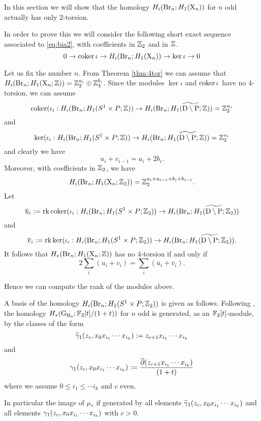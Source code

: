 In this section we will show that the homology $H_{i}(\operatorname{Br}_n; H_1(\mathrm{X}_n))$ for $n$ odd actually has only $2$-torsion.

In order to prove this we will consider the following short exact sequence associated to \eqref{eq:bia2}, with coefficients in $\mathbb{Z}_2$ and in $\mathbb{Z}$.
$$
0 \to \operatorname{\mathrm{coker}} \iota \to H_{i}(\operatorname{Br}_n; H_1(\mathrm{X}_n)) \to \ker \iota \to 0
$$

Let us fix the number $n$. From Theorem \ref{thm:4tor} we can assume that $H_{i}(\operatorname{Br}_n; H_1(\mathrm{X}_n; \mathbb{Z})) = \mathbb{Z}_2^{a_i} \oplus \mathbb{Z}_4^{b_i}$.
Since the modules $\ker \iota$ and $\operatorname{\mathrm{coker}} \iota$ have no $4$-torsion, we can assume $$\operatorname{\mathrm{coker}} (\iota_i :H_{i}(\operatorname{Br}_n; H_1(S^1 \times P;\mathbb{Z})) \to H_{i}(\operatorname{Br}_n; H_1(\widetilde{\mathrm{D} \setminus \mathrm{P}};\mathbb{Z}) ) = \mathbb{Z}_2^{u_i}$$ and $$\ker (\iota_i :H_{i}(\operatorname{Br}_n; H_1(S^1 \times P;\mathbb{Z})) \to H_{i}(\operatorname{Br}_n; H_1(\widetilde{\mathrm{D} \setminus \mathrm{P}};\mathbb{Z}) ) = \mathbb{Z}_2^{v_i}$$
and clearly we have 
$$
u_i + v_{i-1} = a_i + 2 b_i.
$$
Moreover, with coefficients in $\mathbb{Z}_2$, we have
$$
H_{i}(\operatorname{Br}_n; H_1(\mathrm{X}_n; \mathbb{Z}_2)) = \mathbb{Z}_2^{a_i+a_{i-1} + b_i + b_{i-1}}.
$$
Let $$\overline{u}_i := {\operatorname{rk}} \operatorname{\mathrm{coker}} (\iota_i :H_{i}(\operatorname{Br}_n; H_1(S^1 \times P ;\mathbb{Z}_2)) \to H_{i}(\operatorname{Br}_n; H_1(\widetilde{\mathrm{D} \setminus \mathrm{P}} ;\mathbb{Z}_2) ) $$
and 
$$\overline{v}_i := {\operatorname{rk}} \ker (\iota_i :H_{i}(\operatorname{Br}_n; H_1(S^1 \times P ;\mathbb{Z}_2)) \to H_{i}(\operatorname{Br}_n; H_1(\widetilde{\mathrm{D} \setminus \mathrm{P}};\mathbb{Z}_2) ). $$
It follows that $H_*(\operatorname{Br}_n; H_1(\mathrm{X}_n; \mathbb{Z}))$ has no $4$-torsion if and only if 
$$2 \sum_i (u_i + v_i) = \sum_i (\overline{u}_i  + \overline{v}_i ). $$

Hence we can compute the rank of the modules above.

A basis of the homology $H_{i}(\operatorname{Br}_n; H_1(S^1 \times P;\mathbb{Z}_2))$ is given as follows. 
Following \cite{calmar}, the homology $H_*(\operatorname{G_{B_{n}}}; \mathbb{F}_2[t]/(1+t))$ for $n$ odd is generated, as an $\mathbb{F}_2[t]$-module, by the classes of the form
\begin{equation}\label{generators1Z2}
\widetilde{\gamma}_1 (z_c, x_0 x_{i_1} \cdots x_{i_k}) :=z_{c+1} x_{i_1} \cdots x_{i_k}
\end{equation}
 and
\begin{equation}\label{generators2Z2}
\operatorname{\gamma_1}(z_c, x_0 x_{i_1} \cdots x_{i_k}):=\frac{\overline{\partial}(z_{c+1}x_{i_1} \cdots x_{i_k})}{(1+t)}
\end{equation}
where we assume $0 \leq i_1 \leq \cdots i_k$ and $c$ even.


In particular the image of $\mu_*$ if generated by all elements $\widetilde{\gamma}_1 (z_c, x_0 x_{i_1} \cdots x_{i_k})$ and all elements $\operatorname{\gamma_1}(z_c, x_0 x_{i_1} \cdots x_{i_k})$ with $c>0$.


